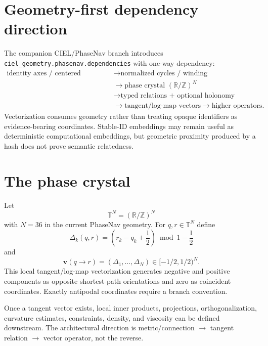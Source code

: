 \section{Geometry-first dependency direction}
The companion CIEL/PhaseNav branch introduces
\texttt{ciel\_geometry.phasenav.dependencies} with one-way dependency:
\begin{equation}
\begin{aligned}
\text{identity axes / centered coordinates}
&\longrightarrow \text{normalized cycles / winding}\\
&\longrightarrow \text{phase crystal }(\mathbb R/\mathbb Z)^N\\
&\longrightarrow \text{typed relations + optional holonomy}\\
&\longrightarrow \text{tangent/log-map vectors}
\longrightarrow \text{higher operators}.
\end{aligned}
\label{eq:dependency-direction}
\end{equation}
Vectorization consumes geometry rather than treating opaque identifiers as
evidence-bearing coordinates. Stable-ID embeddings may remain useful as
deterministic computational embeddings, but geometric proximity produced by a
hash does not prove semantic relatedness.

\section{The phase crystal}
Let
\[
 \mathbb T^N=(\mathbb R/\mathbb Z)^N
\]
with $N=36$ in the current PhaseNav geometry. For $q,r\in\mathbb T^N$ define
\[
 \Delta_k(q,r)=
 \left(r_k-q_k+\frac12\right)\bmod1-\frac12
\]
and
\[
 \mathbf v(q\to r)=(\Delta_1,\ldots,\Delta_N)\in[-1/2,1/2)^N.
\]
This local tangent/log-map vectorization generates negative and positive
components as opposite shortest-path orientations and zero as coincident
coordinates. Exactly antipodal coordinates require a branch convention.

Once a tangent vector exists, local inner products, projections,
orthogonalization, curvature estimates, constraints, density, and viscosity can
be defined downstream. The architectural direction is metric/connection
$\to$ tangent relation $\to$ vector operator, not the reverse.

